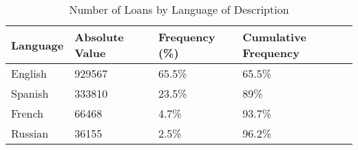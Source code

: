 \begin{table}[!htb]
\centering
\begin{tabular}{llll}
  \hline
Language & Absolute Value & Frequency (\%) & Cumulative Frequency \\ 
  \hline
English & 929567 & 65.5\% & 65.5\% \\ 
  Spanish & 333810 & 23.5\% & 89\% \\ 
  French & 66468 & 4.7\% & 93.7\% \\ 
  Russian & 36155 & 2.5\% & 96.2\% \\ 
   \hline
\end{tabular}
\caption{Number of Loans by Language of Description} 
\label{tab:Loan_Language}
\end{table}

